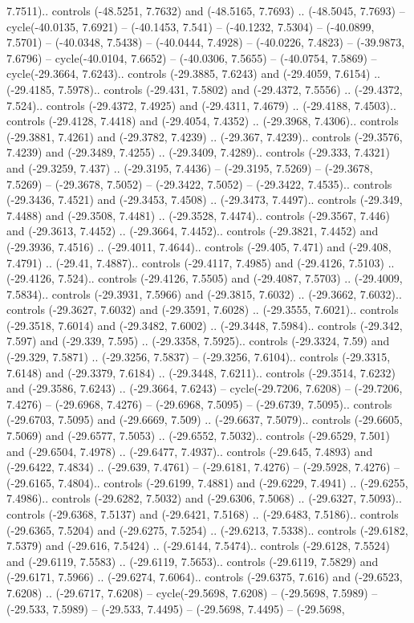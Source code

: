 \begin{scope}[shift={(2.5552, 9.9912)}]
\begin{scope}[shift={(48.1654, -14.8546)}]
7.7511).. controls (-48.5251, 7.7632) and (-48.5165, 7.7693) .. (-48.5045, 7.7693) -- cycle(-40.0135, 7.6921) -- (-40.1453, 7.541) -- (-40.1232, 7.5304) -- (-40.0899, 7.5701) -- (-40.0348, 7.5438) -- (-40.0444, 7.4928) -- (-40.0226, 7.4823) -- (-39.9873, 7.6796) -- cycle(-40.0104, 7.6652) -- (-40.0306, 7.5655) -- (-40.0754, 7.5869) -- cycle(-29.3664, 7.6243).. controls (-29.3885, 7.6243) and (-29.4059, 7.6154) .. (-29.4185, 7.5978).. controls (-29.431, 7.5802) and (-29.4372, 7.5556) .. (-29.4372, 7.524).. controls (-29.4372, 7.4925) and (-29.4311, 7.4679) .. (-29.4188, 7.4503).. controls (-29.4128, 7.4418) and (-29.4054, 7.4352) .. (-29.3968, 7.4306).. controls (-29.3881, 7.4261) and (-29.3782, 7.4239) .. (-29.367, 7.4239).. controls (-29.3576, 7.4239) and (-29.3489, 7.4255) .. (-29.3409, 7.4289).. controls (-29.333, 7.4321) and (-29.3259, 7.437) .. (-29.3195, 7.4436) -- (-29.3195, 7.5269) -- (-29.3678, 7.5269) -- (-29.3678, 7.5052) -- (-29.3422, 7.5052) -- (-29.3422, 7.4535).. controls (-29.3436, 7.4521) and (-29.3453, 7.4508) .. (-29.3473, 7.4497).. controls (-29.349, 7.4488) and (-29.3508, 7.4481) .. (-29.3528, 7.4474).. controls (-29.3567, 7.446) and (-29.3613, 7.4452) .. (-29.3664, 7.4452).. controls (-29.3821, 7.4452) and (-29.3936, 7.4516) .. (-29.4011, 7.4644).. controls (-29.405, 7.471) and (-29.408, 7.4791) .. (-29.41, 7.4887).. controls (-29.4117, 7.4985) and (-29.4126, 7.5103) .. (-29.4126, 7.524).. controls (-29.4126, 7.5505) and (-29.4087, 7.5703) .. (-29.4009, 7.5834).. controls (-29.3931, 7.5966) and (-29.3815, 7.6032) .. (-29.3662, 7.6032).. controls (-29.3627, 7.6032) and (-29.3591, 7.6028) .. (-29.3555, 7.6021).. controls (-29.3518, 7.6014) and (-29.3482, 7.6002) .. (-29.3448, 7.5984).. controls (-29.342, 7.597) and (-29.339, 7.595) .. (-29.3358, 7.5925).. controls (-29.3324, 7.59) and (-29.329, 7.5871) .. (-29.3256, 7.5837) -- (-29.3256, 7.6104).. controls (-29.3315, 7.6148) and (-29.3379, 7.6184) .. (-29.3448, 7.6211).. controls (-29.3514, 7.6232) and (-29.3586, 7.6243) .. (-29.3664, 7.6243) -- cycle(-29.7206, 7.6208) -- (-29.7206, 7.4276) -- (-29.6968, 7.4276) -- (-29.6968, 7.5095) -- (-29.6739, 7.5095).. controls (-29.6703, 7.5095) and (-29.6669, 7.509) .. (-29.6637, 7.5079).. controls (-29.6605, 7.5069) and (-29.6577, 7.5053) .. (-29.6552, 7.5032).. controls (-29.6529, 7.501) and (-29.6504, 7.4978) .. (-29.6477, 7.4937).. controls (-29.645, 7.4893) and (-29.6422, 7.4834) .. (-29.639, 7.4761) -- (-29.6181, 7.4276) -- (-29.5928, 7.4276) -- (-29.6165, 7.4804).. controls (-29.6199, 7.4881) and (-29.6229, 7.4941) .. (-29.6255, 7.4986).. controls (-29.6282, 7.5032) and (-29.6306, 7.5068) .. (-29.6327, 7.5093).. controls (-29.6368, 7.5137) and (-29.6421, 7.5168) .. (-29.6483, 7.5186).. controls (-29.6365, 7.5204) and (-29.6275, 7.5254) .. (-29.6213, 7.5338).. controls (-29.6182, 7.5379) and (-29.616, 7.5424) .. (-29.6144, 7.5474).. controls (-29.6128, 7.5524) and (-29.6119, 7.5583) .. (-29.6119, 7.5653).. controls (-29.6119, 7.5829) and (-29.6171, 7.5966) .. (-29.6274, 7.6064).. controls (-29.6375, 7.616) and (-29.6523, 7.6208) .. (-29.6717, 7.6208) -- cycle(-29.5698, 7.6208) -- (-29.5698, 7.5989) -- (-29.533, 7.5989) -- (-29.533, 7.4495) -- (-29.5698, 7.4495) -- (-29.5698, 
\end{scope}
\end{scope}
